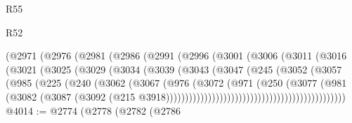 \begin{lexlean}{R55}
\begin{lexlean}{R52}
\begin{coremodule}
{{{{{{{{{{{{{{{{{{{{{{{{{{{{{{{{{{{{{{{{{{{{{{{{{{{{{{{{{{{{{{{{{{{{{{{{{{{{{{{{{{{{{{{{{{{{{{{{{{{{{{{{{{{{{{{{{{{{{{{{{{{{{{{{{{{{{{{{{{{{{{{{{{{{{{{{{{{{{{{{{{{{{{{{{{{{{{{{{{{{{{{{{{{{{{{{{{{{{{                            (@2971
                              (@2976
                                (@2981
                                  (@2986
                                    (@2991
                                      (@2996
                                        (@3001
                                          (@3006
                                            (@3011
                                              (@3016
                                                (@3021
                                                  (@3025
                                                    (@3029
                                                      (@3034
                                                        (@3039
                                                          (@3043
                                                            (@3047
                                                              (@245
                                                                (@3052
                                                                  (@3057
                                                                    (@985
                                                                      (@225
                                                                        (@240
                                                                          (@3062
                                                                            (@3067
                                                                              (@976
                                                                                (@3072
                                                                                  (@971
                                                                                    (@250
                                                                                      (@3077
                                                                                        (@981
                                                                                          (@3082
                                                                                            (@3087
                                                                                              (@3092
                                                                                                (@215
                                                                                                  @3918)))))))))))))))))))))))))))))))))))))))))))))))
@4014 := @2774
    (@2778
      (@2782
        (@2786
}}}}}}}}}}}}}}}}}}}}}}}}}}}}}}}}}}}}}}}}}}}}}}}}}}}}}}}}}}}}}}}}}}}}}}}}}}}}}}}}}}}}}}}}}}}}}}}}}}}}}}}}}}}}}}}}}}}}}}}}}}}}}}}}}}}}}}}}}}}}}}}}}}}}}}}}}}}}}}}}}}}}}}}}}}}}}}}}}}}}}}}}}}}}}}}}}}}}}}
\end{coremodule}
\end{lexlean}
\end{lexlean}
